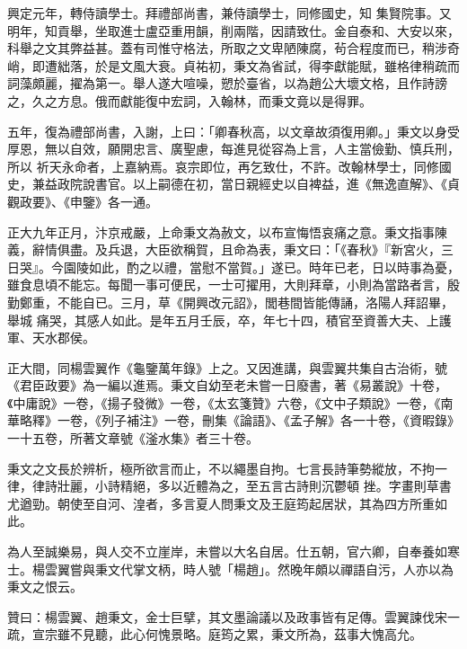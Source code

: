 \begin{pinyinscope}
 興定元年，轉侍讀學士。拜禮部尚書，兼侍讀學士，同修國史，知
 集賢院事。又明年，知貢舉，坐取進士盧亞重用韻，削兩階，因請致仕。金自泰和、大安以來，科舉之文其弊益甚。蓋有司惟守格法，所取之文卑陋陳腐，茍合程度而已，稍涉奇峭，即遭絀落，於是文風大衰。貞祐初，秉文為省試，得李獻能賦，雖格律稍疏而詞藻頗麗，擢為第一。舉人遂大喧噪，愬於臺省，以為趙公大壞文格，且作詩謗之，久之方息。俄而獻能復中宏詞，入翰林，而秉文竟以是得罪。



 五年，復為禮部尚書，入謝，上曰：「卿春秋高，以文章故須復用卿。」秉文以身受厚恩，無以自效，願開忠言、廣聖慮，每進見從容為上言，人主當儉勤、慎兵刑，所以
 祈天永命者，上嘉納焉。哀宗即位，再乞致仕，不許。改翰林學士，同修國史，兼益政院說書官。以上嗣德在初，當日親經史以自裨益，進《無逸直解》、《貞觀政要》、《申鑒》各一通。



 正大九年正月，汴京戒嚴，上命秉文為赦文，以布宣悔悟哀痛之意。秉文指事陳義，辭情俱盡。及兵退，大臣欲稱賀，且命為表，秉文曰：「《春秋》『新宮火，三日哭』。今園陵如此，酌之以禮，當慰不當賀。」遂已。時年已老，日以時事為憂，雖食息頃不能忘。每聞一事可便民，一士可擢用，大則拜章，小則為當路者言，殷勤鄭重，不能自已。三月，草《開興改元詔》，閭巷間皆能傳誦，洛陽人拜詔畢，舉城
 痛哭，其感人如此。是年五月壬辰，卒，年七十四，積官至資善大夫、上護軍、天水郡侯。



 正大間，同楊雲翼作《龜鑒萬年錄》上之。又因進講，與雲翼共集自古治術，號《君臣政要》為一編以進焉。秉文自幼至老未嘗一日廢書，著《易叢說》十卷，《中庸說》一卷，《揚子發微》一卷，《太玄箋贊》六卷，《文中子類說》一卷，《南華略釋》一卷，《列子補注》一卷，刪集《論語》、《孟子解》各一十卷，《資暇錄》一十五卷，所著文章號《滏水集》者三十卷。



 秉文之文長於辨析，極所欲言而止，不以繩墨自拘。七言長詩筆勢縱放，不拘一律，律詩壯麗，小詩精絕，多以近體為之，至五言古詩則沉鬱頓
 挫。字畫則草書尤遒勁。朝使至自河、湟者，多言夏人問秉文及王庭筠起居狀，其為四方所重如此。



 為人至誠樂易，與人交不立崖岸，未嘗以大名自居。仕五朝，官六卿，自奉養如寒士。楊雲翼嘗與秉文代掌文柄，時人號「楊趙」。然晚年頗以禪語自污，人亦以為秉文之恨云。



 贊曰：楊雲翼、趙秉文，金士巨擘，其文墨論議以及政事皆有足傳。雲翼諫伐宋一疏，宣宗雖不見聽，此心何愧景略。庭筠之累，秉文所為，茲事大愧高允。




\end{pinyinscope}

